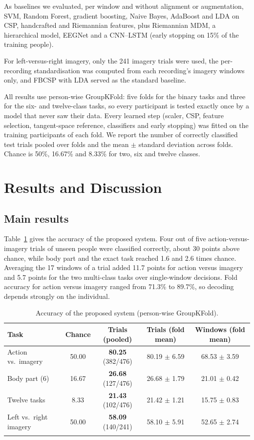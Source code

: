 \documentclass[pdflatex,sn-mathphys-num]{sn-jnl}%
\theoremstyle{thmstyleone}%
\theoremstyle{thmstyletwo}%
\theoremstyle{thmstylethree}%
\begin{document}
As baselines we evaluated, per window and without alignment or augmentation, SVM, Random Forest, gradient boosting, Naive Bayes, AdaBoost and LDA on CSP, handcrafted and Riemannian features, plus Riemannian MDM, a hierarchical model, EEGNet \citep{Lawhern2018} and a CNN--LSTM (early stopping on 15\% of the training people).

For left-versus-right imagery, only the 241 imagery trials were used, the per-recording standardisation was computed from each recording's imagery windows only, and FBCSP with LDA \citep{Ang2012} served as the standard baseline.

All results use person-wise GroupKFold: five folds for the binary tasks and three for the six- and twelve-class tasks, so every participant is tested exactly once by a model that never saw their data. Every learned step (scaler, CSP, feature selection, tangent-space reference, classifiers and early stopping) was fitted on the training participants of each fold. We report the number of correctly classified test trials pooled over folds and the mean $\pm$ standard deviation across folds. Chance is 50\%, 16.67\% and 8.33\% for two, six and twelve classes.

\section{Results and Discussion}\label{sec:results}

\subsection{Main results}
Table~\ref{tab:main} gives the accuracy of the proposed system. Four out of five action-versus-imagery trials of unseen people were classified correctly, about 30 points above chance, while body part and the exact task reached 1.6 and 2.6 times chance. Averaging the 17 windows of a trial added 11.7 points for action versus imagery and 5.7 points for the two multi-class tasks over single-window decisions. Fold accuracy for action versus imagery ranged from 71.3\% to 89.7\%, so decoding depends strongly on the individual.

\begin{table}[!htbp]
\centering
\caption{Accuracy of the proposed system (person-wise GroupKFold).}
\label{tab:main}
\footnotesize
\begin{tabular}{@{}lcccc@{}}
\toprule
Task & Chance & Trials (pooled) & Trials (fold mean) & Windows (fold mean) \\
\midrule
Action vs.\ imagery & 50.00 & \textbf{80.25} (382/476) & 80.19 $\pm$ 6.59 & 68.53 $\pm$ 3.59 \\
Body part (6) & 16.67 & \textbf{26.68} (127/476) & 26.68 $\pm$ 1.79 & 21.01 $\pm$ 0.42 \\
Twelve tasks & 8.33 & \textbf{21.43} (102/476) & 21.42 $\pm$ 1.21 & 15.75 $\pm$ 0.83 \\
Left vs.\ right imagery & 50.00 & \textbf{58.09} (140/241) & 58.10 $\pm$ 5.91 & 52.65 $\pm$ 2.74 \\
\botrule
\end{tabular}
\end{table}
\end{document}
